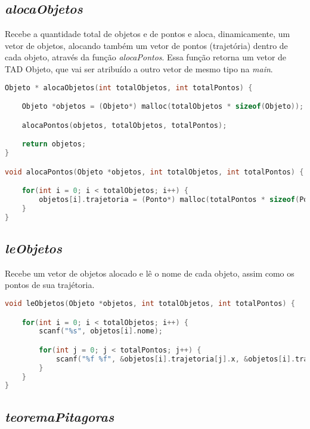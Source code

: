 \documentclass{article}
\begin{document}

\subsection{\textit{alocaObjetos}}

\hspace*{\parindent}Recebe a quantidade total de objetos e de pontos e aloca, dinamicamente, um vetor de objetos, alocando também um vetor de pontos (trajetória) dentro de cada objeto, através da função \textit{alocaPontos}. Essa função retorna um vetor de TAD Objeto, que vai ser atribuído a outro vetor de mesmo tipo na \textit{main}.

\begin{lstlisting}[label={lst:cod1},language=C]
Objeto * alocaObjetos(int totalObjetos, int totalPontos) {

    Objeto *objetos = (Objeto*) malloc(totalObjetos * sizeof(Objeto));

    alocaPontos(objetos, totalObjetos, totalPontos);

    return objetos;
}

void alocaPontos(Objeto *objetos, int totalObjetos, int totalPontos) {

    for(int i = 0; i < totalObjetos; i++) {
        objetos[i].trajetoria = (Ponto*) malloc(totalPontos * sizeof(Ponto));
    }
}
\end{lstlisting}


\subsection{\textit{leObjetos}}

\hspace*{\parindent}Recebe um vetor de objetos alocado e lê o nome de cada objeto, assim como os pontos de sua trajétoria.

\begin{lstlisting}[label={lst:cod1},language=C]
void leObjetos(Objeto *objetos, int totalObjetos, int totalPontos) {

    for(int i = 0; i < totalObjetos; i++) {
        scanf("%s", objetos[i].nome);

        for(int j = 0; j < totalPontos; j++) {
            scanf("%f %f", &objetos[i].trajetoria[j].x, &objetos[i].trajetoria[j].y);
        }
    }
}
\end{lstlisting}


\subsection{\textit{teoremaPitagoras}}
\end{document}

